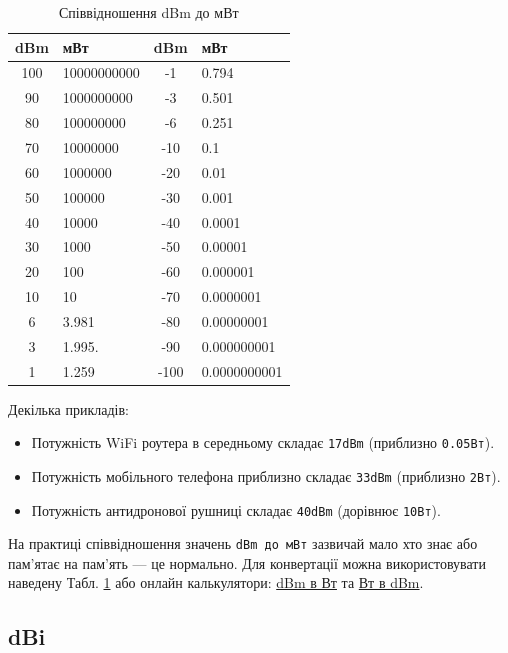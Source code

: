 \documentclass{article}
\begin{document}
\begin{table}[h!]
\centering
\begin{tabular}{|c|l||c|l|}
\hline
\textbf{dBm}  & \textbf{мВт} & \textbf{dBm} & \textbf{мВт} \\
\hline
100  & 10000000000  &  -1  & 0.794 \\
90   & 1000000000   &  -3  & 0.501  \\
80   & 100000000    &  -6  & 0.251  \\
70   & 10000000     & -10  & 0.1 \\
60   & 1000000      & -20  & 0.01 \\
50   & 100000       & -30  & 0.001 \\
40   & 10000        & -40  & 0.0001 \\
30   & 1000         & -50  & 0.00001 \\
20   & 100          & -60  & 0.000001 \\
10   & 10           & -70  & 0.0000001 \\
 6   & 3.981        & -80  & 0.00000001 \\
 3   & 1.995.       & -90  & 0.000000001 \\
 1   & 1.259        & -100 & 0.0000000001 \\
\hline
\end{tabular}
\caption{\label{table:dbm2mwatts}Співвідношення dBm до мВт}
\end{table}

Декілька прикладів:
\begin{itemize}[noitemsep, topsep=8pt]
\item Потужність WiFi роутера в середньому складає \texttt{17dBm} (приблизно \texttt{0.05Вт}).
\item Потужність мобільного телефона приблизно складає \texttt{33dBm} (приблизно \texttt{2Вт}).
\item Потужність антидронової рушниці складає \texttt{40dBm} (дорівнює \texttt{10Вт}).
\end{itemize}

На практиці співвідношення значень \texttt{dBm до мВт} зазвичай мало хто знає або пам'ятає на пам'ять --- це нормально. Для конвертації можна використовувати наведену Табл. \ref{table:dbm2mwatts} або онлайн калькулятори: \href{https://www.everythingrf.com/rf-calculators/dbm-to-watts}{dBm в Вт} та \href{https://www.everythingrf.com/rf-calculators/watt-to-dbm}{Вт в dBm}.
\subsection{dBi}
\end{document}
